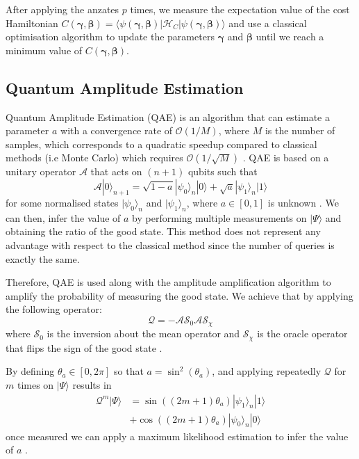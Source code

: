 \documentclass[prx,twocolumn,floatfix,superscriptaddress,longbibliography]{revtex4-1}
\begin{document}
After applying the anzates $p$ times, we measure the expectation value of the cost Hamiltonian $C(\boldsymbol{\gamma},\boldsymbol{\beta}) = \langle \psi(\boldsymbol{\gamma}, \boldsymbol{\beta})|\mathcal{H}_C|\psi(\boldsymbol{\gamma},\boldsymbol{\beta})\rangle$ and use a classical optimisation algorithm to update the parameters $\boldsymbol{\gamma}$ and $\boldsymbol{\beta}$ until we reach a minimum value of $C(\boldsymbol{\gamma},\boldsymbol{\beta})$.

\subsection{Quantum Amplitude Estimation}

Quantum Amplitude Estimation (QAE) is an algorithm that can estimate a parameter $a$ with a convergence rate of $\mathcal{O}(1/M)$, where $M$ is the number of samples, which corresponds to a quadratic speedup compared to classical methods (i.e Monte Carlo) which requires $\mathcal{O}(1/\sqrt{M})$ \cite{Egger2020}.  QAE is based on a unitary operator $\mathcal{A}$  that acts on $(n+1)$ qubits such that 
\begin{equation}
  \label{eq:17}
  \mathcal{A}|0\rangle_{n+1} = \sqrt{1-a}|\psi_0\rangle_n|0\rangle + \sqrt{a}|\psi_1\rangle_n|1\rangle
\end{equation}
for some normalised states $|\psi_0\rangle_n$ and $|\psi_1\rangle_n$, where $a \in [0,1]$ is unknown \cite{Stamatopoulos2020}. We can then, 
infer the value of $a$ by performing multiple measurements on $|\Psi\rangle$ and obtaining the ratio of the good state. This method does not represent any advantage with respect to the classical method since the number of queries is exactly the same.  

Therefore, QAE is used along with the amplitude amplification algorithm to amplify the probability of measuring the good state. We achieve that by applying the following operator: 
\begin{equation}
  \label{eq:18}
  \mathcal{Q} = -\mathcal{A} \mathcal{S}_0 \mathcal{A} \mathcal{S}_{\chi}
\end{equation}
where $\mathcal{S}_0$ is the inversion about the mean operator and $\mathcal{S}_{\chi}$ is the oracle operator that flips the sign of the good state \cite{Suzuki2020}.

By defining $\theta_a \in [0, 2\pi]$  so that $a = \sin^2(\theta_a)$, and applying repeatedly $\mathcal{Q}$ for $m$ times on $|\Psi\rangle$  results in
\begin{equation}
  \label{eq:19}
\begin{aligned}
  \mathcal{Q}^m |\Psi\rangle  &= \sin((2m + 1)\theta_a)|\psi_1\rangle_n|1\rangle\\
  & + \cos((2m + 1)\theta_a)|\psi_0\rangle_n|0\rangle 
\end{aligned}
\end{equation}
once measured we can apply a maximum likelihood estimation to infer the value of $a$ \cite{Suzuki2020}.
\end{document}
